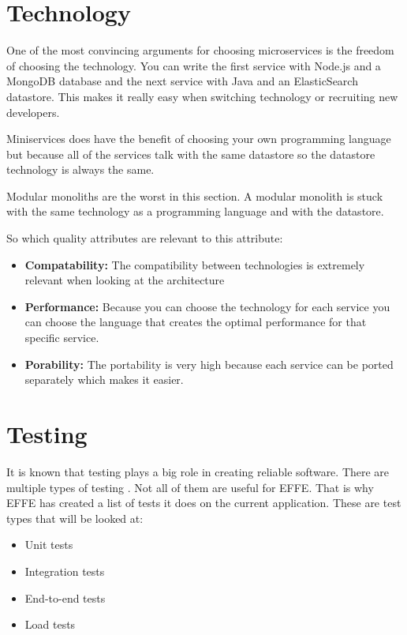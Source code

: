 \section{Technology}
\label{sec:Technology}

One of the most convincing arguments for choosing microservices is the freedom of choosing the technology. You can write the first service with Node.js and a MongoDB database and the next service with Java and an ElasticSearch datastore. This makes it really easy when switching technology or recruiting new developers.

Miniservices does have the benefit of choosing your own programming language but because all of the services talk with the same datastore so the datastore technology is always the same.

Modular monoliths are the worst in this section. A modular monolith is stuck with the same technology as a programming language and with the datastore.

So which quality attributes are relevant to this attribute:
\begin{itemize}
        \item \textbf{Compatability:} The compatibility between technologies is extremely relevant when looking at the architecture
        \item \textbf{Performance:} Because you can choose the technology for each service you can choose the language that creates the optimal performance for that specific service.
        \item \textbf{Porability:} The portability is very high because each service can be ported separately which makes it easier.
\end{itemize}

\section{Testing}
\label{sec:Testing}

It is known that testing plays a big role in creating reliable software. There are multiple types of testing \cite{testTypes}. Not all of them are useful for EFFE. That is why EFFE has created a list of tests it does on the current application. These are test types that will be looked at:

\begin{itemize}
        \item Unit tests
        \item Integration tests
        \item End-to-end tests
        \item Load tests
\end{itemize}

